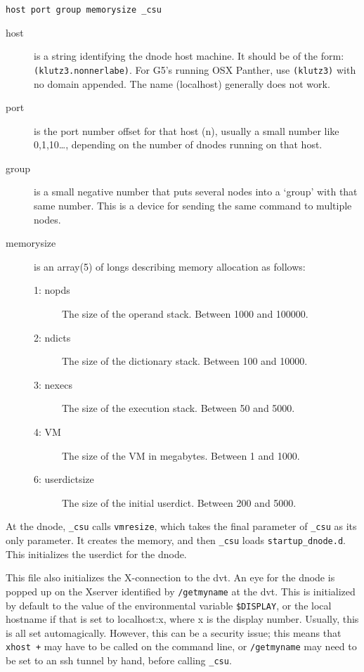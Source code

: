 \documentclass[12pt]{article}
\begin{document}
\verb$host port group memorysize _csu$
\begin{description}
  \item[host] is a string identifying the dnode host machine. It
  should be of the form: \verb$(klutz3.nonnerlabe)$. For G5's running
  OSX Panther, use \verb$(klutz3)$ with no domain appended. The name
  (localhost) generally does not work.
  \item[port] is the port number offset for that host (n), usually a
  small number like 0,1,10\dots, depending on the number of dnodes
  running on that host.
  \item[group] is a small negative number that puts several nodes into
  a `group' with that same number. This is a device for sending the
  same command to multiple nodes.
  \item[memorysize] is an array(5) of longs describing memory
  allocation as follows:
  \begin{description}
    \item[1: nopds] The size of the operand stack. Between 1000 and
    100000.
    \item[2: ndicts] The size of the dictionary stack. Between 100 and 10000.
    \item[3: nexecs] The size of the execution stack. Between 50 and 5000.
    \item[4: VM] The size of the VM in megabytes. Between 1 and 1000.
    \item[6: userdictsize]  The size of the initial userdict. Between
    200 and 5000.
  \end{description}
\end{description}

At the dnode, \verb$_csu$ calls \verb$vmresize$, which takes the final
parameter of \verb$_csu$ as its only parameter. It creates the memory,
and then \verb$_csu$ loads \texttt{startup\_dnode.d}. This initializes
the userdict for the dnode.

This file also initializes the X-connection to the dvt. An eye for the
dnode is popped up on the Xserver identified by \verb$/getmyname$ at
the dvt. This is initialized by default to the value of the
environmental variable \verb-$DISPLAY-,%
or the local hostname if that is set to localhost:x, where x is the
display number.  Usually, this is all set automagically.  However,
this can be a security issue; this means that \verb$xhost +$ may have
to be called on the command line, or \verb$/getmyname$ may need to be
set to an ssh tunnel by hand, before calling \verb$_csu$.
\end{document}
